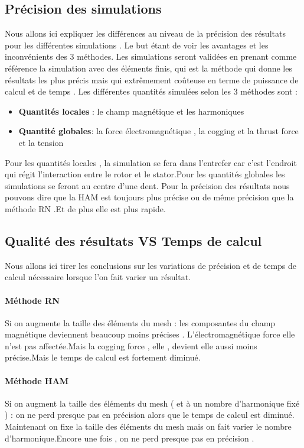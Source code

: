 \subsection{Précision des simulations}
Nous allons ici expliquer les différences au niveau de la précision des résultats pour les différentes simulations . Le but étant de voir les avantages et les inconvénients des 3 méthodes. Les simulations seront validées en prenant comme référence la simulation avec des éléments finis, qui est la méthode  qui donne les résultats les plus précis mais qui extrêmement coûteuse en terme de puissance de calcul et de temps .
Les différentes quantités simulées selon les 3 méthodes sont :
\begin{itemize}
 \item \textbf{Quantités locales} : le champ magnétique  et les harmoniques
  \item \textbf{Quantité globales}:  la force électromagnétique , la cogging et la thrust force et la tension
\end{itemize}
Pour les quantités locales , la simulation se fera dans l'entrefer car c'est l'endroit qui régit l'interaction entre le rotor et le stator.Pour les quantités globales les simulations se feront au centre d'une dent.
\bigbreak
Pour la précision des résultats nous pouvons dire que la HAM est toujours plus précise ou de même précision que la méthode RN .Et de plus elle est plus rapide.

\subsection{Qualité des résultats VS Temps de calcul}
Nous allons ici tirer les conclusions sur les variations de précision et de temps de calcul nécessaire lorsque l'on fait varier un résultat.

\paragraph{Méthode RN}
\bigbreak

    Si on augmente la taille des éléments du mesh : les composantes du champ magnétique deviennent beaucoup moins précises . L'électromagnétique force elle n'est pas affectée.Mais la cogging force , elle , devient elle aussi moins précise.Mais le temps de calcul est fortement diminué.

\paragraph{Méthode HAM}
\bigbreak
 Si on augment la taille des éléments du mesh ( et à un nombre d'harmonique fixé ) : on ne perd presque pas en précision alors que le temps de calcul est diminué. 
 \bigbreak
 Maintenant on fixe la taille des éléments du mesh mais on fait varier le nombre d'harmonique.Encore une fois , on ne perd presque pas en précision .
 
